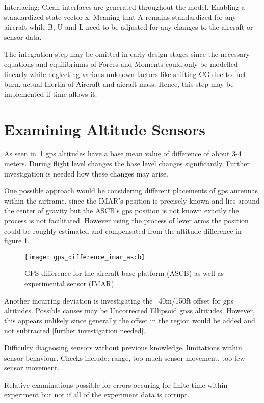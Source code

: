 Interfacing: Clean interfaces are generated throughout the model. Enabling a standardized state vector x. Meaning that A remains standardized for any aircraft while B, U and L need to be adjusted for any changes to the aircraft or sensor data.

The integration step may be omitted in early design stages since the necessary equations and equilibriums of Forces and Moments could only be modelled linearly while neglecting various unknown factors like shifting CG due to fuel burn, actual Inertia of Aircraft and aicraft mass. Hence, this step may be implemented if time allows it.


\section{Examining Altitude Sensors}

As seen in~\ref{fig:gps_diff} gps altitudes have a base mean value of difference of about 3-4 meters. During flight level changes the base level changes significantly. Further investigation is needed how these changes may arise.

One possible approach would be considering different placements of gps antennas within the airframe. since the IMAR's position is precisely known and lies around the center of gravity but the ASCB's gps position is not known exactly the process is not facilitated. However using the process of lever arms the position could be roughly estimated and compensated from the altitude difference in figure \ref{fig:gps_diff}.

\begin{figure}[h]
    \centering
    \texttt{[image: gps\_difference\_imar\_ascb]}
    \caption{GPS difference for the aircraft base platform (ASCB) as well as experimental sensor (IMAR)}
    \label{fig:gps_diff}
\end{figure}

Another incurring deviation is investigating the ~40m/150ft offset for gps altitudes. Possible causes may be Uncorrected Ellipsoid gnss altitudes. However, this appears unlikely since generally the offset in the region would be added and not subtracted [further investigation needed].


Difficulty diagnosing sensors without previous knowledge. limitations within sensor behaviour. Checks include: range, too much sensor movement, too few sensor movement.

Relative examinations possible for errors occuring for finite time within experiment but not if all of the experiment data is corrupt.





